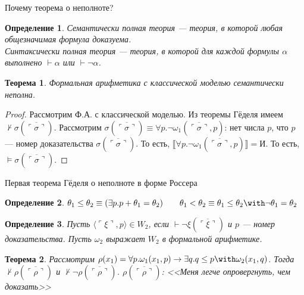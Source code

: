 \documentclass[aspectratio=169]{beamer}
\newtheorem{thm}{Теорема}[section]
\newtheorem{dfn}{Определение}[section]
\begin{document}
\begin{frame}{Почему теорема о неполноте?}
\begin{dfn}\emph{Семантически} полная теория --- теория, в которой любая общезначимая формула доказуема.\\
\emph{Синтаксически} полная теория --- теория, в которой для каждой формулы $\alpha$ выполнено $\vdash\alpha$ или $\vdash\neg\alpha$.\end{dfn}
\begin{thm}Формальная арифметика с классической моделью семантически неполна.\end{thm} \pause
\begin{proof}
 Рассмотрим Ф.А. с классической моделью. \pause
 Из теоремы Гёделя имеем $\not\vdash\sigma(\overline{\ulcorner\sigma\urcorner})$. \pause
 Рассмотрим $\sigma(\overline{\ulcorner\sigma\urcorner}) \equiv \forall p.\neg\omega_1(\overline{\ulcorner\sigma\urcorner},p)$:
нет числа $p$, что $p$ --- номер доказательства $\sigma(\overline{\ulcorner\sigma\urcorner})$. \pause 
 То есть, $\llbracket \forall p.\neg\omega_1(\overline{\ulcorner\sigma\urcorner},p) \rrbracket = \text{И}$. \pause
 То есть, $\models \sigma(\overline{\ulcorner\sigma\urcorner})$.
\end{proof}

\end{frame}

\begin{frame}{Первая теорема Гёделя о неполноте в форме Россера}
\begin{dfn}$\theta_1\le\theta_2 \equiv (\exists p.p+\theta_1=\theta_2)\quad\quad\theta_1<\theta_2\equiv\theta_1\le\theta_2\with\neg\theta_1=\theta_2$\end{dfn}\pause
\begin{dfn}Пусть $\langle \ulcorner\xi\urcorner,p\rangle \in W_2$, если $\vdash\neg\xi(\overline{\ulcorner\xi\urcorner})$ и $p$ --- номер доказательства.
Пусть $\omega_2$ выражает $W_2$ в формальной арифметике.\end{dfn}\pause
\begin{thm}Рассмотрим $\rho(x_1) = \forall p.\omega_1(x_1,p)\rightarrow\exists q.q \le p \with \omega_2(x_1,q)$. \pause
Тогда $\not\vdash\rho(\overline{\ulcorner\rho\urcorner})$ и $\not\vdash\neg\rho(\overline{\ulcorner\rho\urcorner})$. \pause
$\rho(\overline{\ulcorner\rho\urcorner})$: <<Меня легче опровергнуть, чем доказать>>
\end{thm}%
\end{frame}
\end{document}

